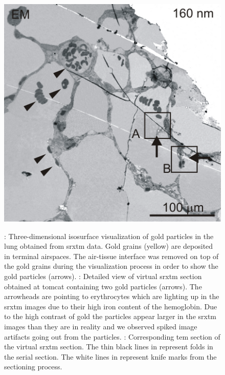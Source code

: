 \begin{figure}[p]
{		\includegraphics[height=\imsize]{img/XRM2008/em/au900-1b-b}%
		\label{subfig:slice-em}%
		}%
	\caption[\threed visualization of gold particles in the lung]{: Three-dimensional isosurface visualization of gold particles in the lung obtained from \ac{srxtm} data. Gold grains (yellow) are deposited in terminal airspaces. The air-tissue interface was removed on top of the gold grains during the visualization process in order to show the gold particles (arrows). : Detailed view of virtual \ac{srxtm} section obtained at \ac{tomcat} containing two gold particles (arrows). The arrowheads are pointing to erythrocytes which are lighting up in the \ac{srxtm} images due to their high iron content of the hemoglobin. Due to the high contrast of gold the particles appear larger in the \ac{srxtm} images than they are in reality and we observed spiked image artifacts going out from the particles. : Corresponding \ac{tem} section of the virtual \ac{srxtm} section. The thin black lines in  represent folds in the serial section. The white lines in  represent knife marks from the sectioning process.}%
	\label{fig:imaris}%
\end{figure}

